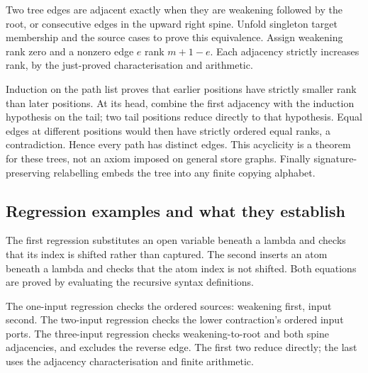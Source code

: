 Two tree edges are adjacent exactly when they are weakening followed by the
root, or consecutive edges in the upward right spine. Unfold singleton target
membership and the source cases to prove this equivalence. Assign weakening
rank zero and a nonzero edge $e$ rank $m+1-e$. Each adjacency strictly increases
rank, by the just-proved characterisation and arithmetic.




Induction on the path list proves that earlier positions have strictly smaller
rank than later positions. At its head, combine the first adjacency with the
induction hypothesis on the tail; two tail positions reduce directly to that
hypothesis. Equal edges at different positions would then have strictly
ordered equal ranks, a contradiction. Hence every path has distinct edges.
This acyclicity is a theorem for these trees, not an axiom imposed on general
store graphs. Finally signature-preserving relabelling embeds the tree into
any finite copying alphabet.




\subsection{Regression examples and what they establish}

The first regression substitutes an open variable beneath a lambda and checks
that its index is shifted rather than captured. The second inserts an atom
beneath a lambda and checks that the atom index is not shifted. Both equations
are proved by evaluating the recursive syntax definitions.



The one-input regression checks the ordered sources: weakening first, input
second. The two-input regression checks the lower contraction's ordered input
ports. The three-input regression checks weakening-to-root and both spine
adjacencies, and excludes the reverse edge. The first two reduce directly;
the last uses the adjacency characterisation and finite arithmetic.

